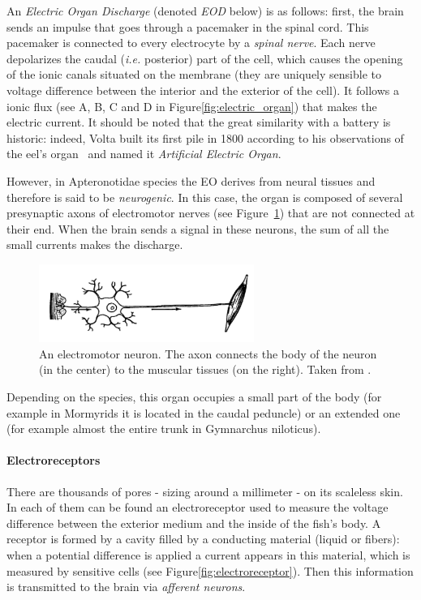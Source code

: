 An \emph{Electric Organ Discharge} (denoted \emph{EOD} below) is as
follows: first, the brain sends an impulse that goes through a pacemaker
in the spinal cord. This pacemaker is connected to every electrocyte
by a \emph{spinal nerve}. Each nerve depolarizes the caudal (\emph{i.e.}
posterior) part of the cell, which causes the opening of the ionic
canals situated on the membrane (they are uniquely sensible to voltage
difference between the interior and the exterior of the cell). It
follows a ionic flux (see A, B, C and D in Figure\ref{fig:electric_organ})
that makes the electric current. It should be noted that the great
similarity with a battery is historic: indeed, Volta built its first
pile in 1800 according to his observations of the eel's organ~\cite{volta1800electricity}
and named it \emph{Artificial Electric Organ}.

However, in Apteronotidae species the EO derives from neural tissues
and therefore is said to be \emph{neurogenic}. In this case, the organ
is composed of several presynaptic axons of electromotor nerves (see
Figure~\ref{fig:neurone}) that are not connected at their end. When
the brain sends a signal in these neurons, the sum of all the small
currents makes the discharge.

\begin{figure}
\centering
\includegraphics[width=7cm]{intro/figures/neurone}
\caption{An electromotor neuron. The axon connects the body of the neuron (in the center) to the muscular tissues (on the right). Taken from \cite{rouviere2002}. \label{fig:neurone}}
\end{figure}

Depending on the species, this organ occupies a small part of the
body (for example in Mormyrids it is located in the caudal peduncle)
or an extended one (for example almost the entire trunk in Gymnarchus
niloticus).


\paragraph{Electroreceptors}

\label{sub:electrorecepteurs}

There are thousands of pores - sizing around a millimeter - on its
scaleless skin. In each of them can be found an electroreceptor used
to measure the voltage difference between the exterior medium and
the inside of the fish's body. A receptor is formed by a cavity filled
by a conducting material (liquid or fibers): when a potential difference
is applied a current appears in this material, which is measured by
sensitive cells (see Figure\ref{fig:electroreceptor}).
Then this information is transmitted to the brain via \emph{afferent
neurons}.

